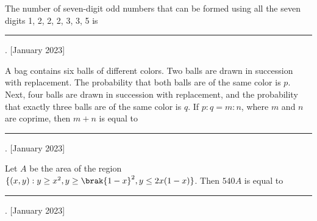     \item The number of seven-digit odd numbers that can be formed using all the seven digits 1, 2, 2, 2, 3, 3, 5 is \rule{2.5cm}{0.4pt}.
    \hfill{[January 2023]}
    
    \item A bag contains six balls of different colors. Two balls are drawn in succession with replacement. The probability that both balls are of the same color is $p$. Next, four balls are drawn in succession with replacement, and the probability that exactly three balls are of the same color is $q$. If $p : q = m : n$, where $m$ and $n$ are coprime, then $m + n$ is equal to \rule{2.5cm}{0.4pt}.
    \hfill{[January 2023]}
    
    \item Let $A$ be the area of the region $\{(x, y) : y \geq x^2, y \geq \brak{1 - x}^2, y \leq 2x(1 - x)\}$. Then $540A$ is equal to \rule{2.5cm}{0.4pt}.
    \hfill{[January 2023]}
